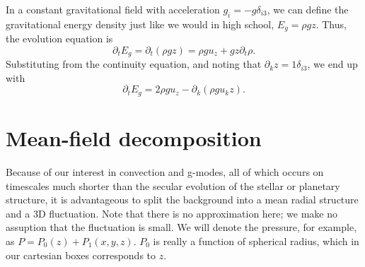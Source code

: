 \documentclass[letterpaper,12pt]{paper}
\begin{document}
In a constant gravitational field with acceleration
$g_i = -g \delta_{i3}$, we can define the gravitational energy density
just like we would in high school, $E_g = \rho g z$. Thus, the
evolution equation is 
\begin{equation}
  \label{eq:grav_en}
  \partial_t E_g = \partial_t (\rho g z) = \rho g u_z + g z \partial_t \rho.
\end{equation}
Substituting from the continuity equation, and noting that $\partial_k
z = 1 \delta_{i3}$, we end up with
\begin{equation}
  \label{eq:grav_en_final}
  \partial_t E_g = 2 \rho g u_z - \partial_k (\rho g u_k z).
\end{equation}

\section{Mean-field decomposition}
\label{sec:meanfield}
Because of our interest in convection and g-modes, all of which occurs
on timescales much shorter than the secular evolution of the stellar
or planetary structure, it is advantageous to split the background
into a mean radial structure and a 3D fluctuation. Note that there is
no approximation here; we make no assuption that the fluctuation is
small. We will denote the pressure, for example, as $P = P_0(z) +
P_1(x,y,z)$. $P_0$ is really a function of spherical radius, which in our
cartesian boxes corresponds to $z$. 
\end{document}
